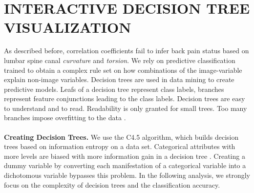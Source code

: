 \documentclass[a4paper,twoside]{style/article}
\begin{document}
\section{\uppercase{Interactive Decision Tree Visualization}}
\label{sec:DecisionTrees}
\noindent As described before, correlation coefficients fail to infer back pain status based on lumbar spine canal \emph{curvature} and \emph{torsion}.
We rely on predictive classification trained to obtain a complex rule set on how combinations of the image-variable explain non-image variables.
Decision trees are used in data mining to create predictive models.
Leafs of a decision tree represent class labels, branches represent feature conjunctions leading to the class labels.
Decision trees are easy to understand and to read.
Readability is only granted for small trees.
Too many branches impose overfitting to the data \cite{DecisionTree}.
\\\\
\noindent \textbf{Creating Decision Trees.}
We use the C4.5 algorithm, which builds decision trees based on information entropy on a data set.
Categorical attributes with more levels are biased with more information gain in a decision tree \cite{deng2011bias}.
Creating a dummy variable by converting each manifestation of a categorical variable into a dichotomous variable bypasses this problem.
In the following analysis, we strongly focus on the complexity of decision trees and the classification accuracy.
%
\end{document}
